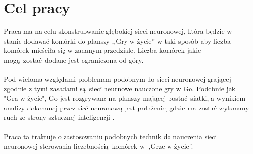     \section{Cel pracy}
        Praca ma na celu skonstruowanie głębokiej sieci neuronowej, 
        która będzie w stanie dodawać komórki do planszy ,,Gry w życie''
        w taki sposób aby liczba komórek mieściła się w zadanym
        przedziale. Liczba komórek jakie mogą zostać dodane jest
        ograniczona od góry. 
        \\ \\
        Pod wieloma względami problemem podobnym do sieci neuronowej
        grającej zgodnie z tymi zasadami są sieci neurnowe nauczone gry
        w Go. Podobnie jak "Gra w życie", Go jest rozgrywane na planszy
        mającej postać siatki, a wynikiem analizy dokonanej przez sieć 
        neuronową jest położenie, gdzie ma zostać wykonany ruch ze
        strony sztucznej inteligencji \cite{alpha-go, toronto-go-1,
        toronto-go-2}.
        \\ \\
        Praca ta traktuje o zastosowaniu podobnych technik do nauczenia
        sieci neuronowej sterowania liczebnością komórek w ,,Grze w 
        życie''.
